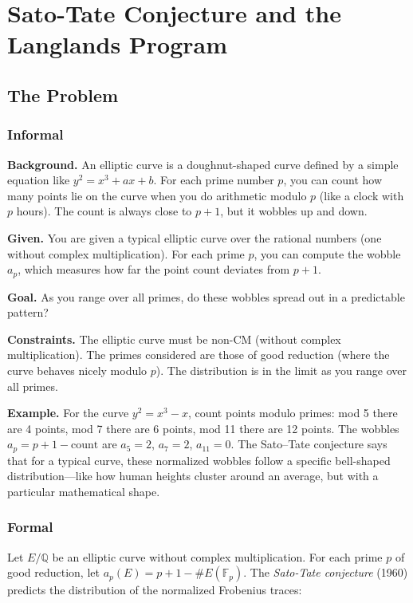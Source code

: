 \let\LocalMacro\relax

\chapter{Sato-Tate Conjecture and the Langlands Program}

\section{The Problem}

\subsection{Informal}

\textbf{Background.} An elliptic curve is a doughnut-shaped curve defined by a simple equation like $y^2 = x^3 + ax + b$. For each prime number $p$, you can count how many points lie on the curve when you do arithmetic modulo $p$ (like a clock with $p$ hours). The count is always close to $p + 1$, but it wobbles up and down.

\textbf{Given.} You are given a typical elliptic curve over the rational numbers (one without complex multiplication). For each prime $p$, you can compute the wobble $a_p$, which measures how far the point count deviates from $p + 1$.

\textbf{Goal.} As you range over all primes, do these wobbles spread out in a predictable pattern?

\textbf{Constraints.} The elliptic curve must be non-CM (without complex multiplication). The primes considered are those of good reduction (where the curve behaves nicely modulo $p$). The distribution is in the limit as you range over all primes.

\textbf{Example.} For the curve $y^2 = x^3 - x$, count points modulo primes: mod 5 there are 4 points, mod 7 there are 6 points, mod 11 there are 12 points. The wobbles $a_p = p + 1 - \text{count}$ are $a_5 = 2$, $a_7 = 2$, $a_11 = 0$. The Sato--Tate conjecture says that for a typical curve, these normalized wobbles follow a specific bell-shaped distribution---like how human heights cluster around an average, but with a particular mathematical shape.

\subsection{Formal}
Let $E/\mathbb{Q}$ be an elliptic curve without complex multiplication. For each prime $p$ of good reduction, let $a_p(E) = p + 1 - \#E(\mathbb{F}_p)$. The \emph{Sato-Tate conjecture} (1960) predicts the distribution of the normalized Frobenius traces:

